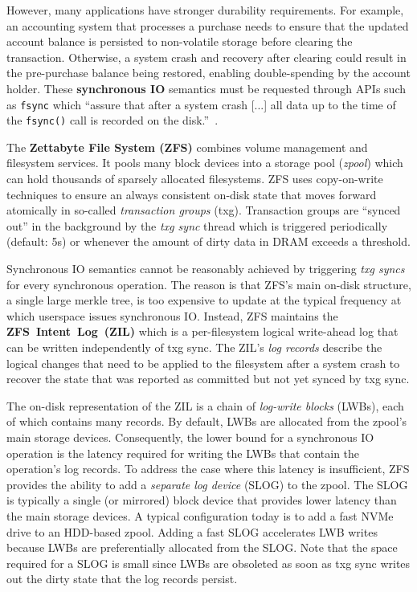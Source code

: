 \documentclass[12pt,a4paper,twoside]{book}
\begin{document}
However, many applications have stronger durability requirements.
For example, an accounting system that processes a purchase needs to ensure that the updated account balance is persisted to non-volatile storage before clearing the transaction.
Otherwise, a system crash and recovery after clearing could result in the pre-purchase balance being restored, enabling double-spending by the account holder.
These \textbf{synchronous IO} semantics must be requested through APIs such as \lstinline{fsync} which ``assure that after a system crash [...] all data up to the time of the \lstinline{fsync()} call is recorded on the disk.''~\cite{OpenGroupFsync}.

The \textbf{Zettabyte File System (ZFS)} combines volume management and filesystem services.
It pools many block devices into a storage pool (\textit{zpool}) which can hold thousands of sparsely allocated filesystems.
ZFS uses copy-on-write techniques to ensure an always consistent on-disk state that moves forward atomically in so-called \textit{transaction groups} (txg).
Transaction groups are ``synced out'' in the background by the \textit{txg sync} thread which is triggered periodically (default: 5s) or whenever the amount of dirty data in DRAM exceeds a threshold.

Synchronous IO semantics cannot be reasonably achieved by triggering \textit{txg syncs} for every synchronous operation.
The reason is that ZFS's main on-disk structure, a single large merkle tree, is too expensive to update at the typical frequency at which userspace issues synchronous IO.
Instead, ZFS maintains the \mbox{\textbf{ZFS Intent Log (ZIL)}} which is a per-filesystem logical write-ahead log that can be written independently of txg sync.
The ZIL's \textit{log records} describe the logical changes that need to be applied to the filesystem after a system crash to recover the state that was reported as committed but not yet synced by txg sync.

The on-disk representation of the ZIL is a chain of \textit{log-write blocks} (LWBs), each of which contains many records.
By default, LWBs are allocated from the zpool's main storage devices.
Consequently, the lower bound for a synchronous IO operation is the latency required for writing the LWBs that contain the operation's log records.
To address the case where this latency is insufficient, ZFS provides the ability to add a \textit{separate log device} (SLOG) to the zpool.
The SLOG is typically a single (or mirrored) block device that provides lower latency than the main storage devices.
A typical configuration today is to add a fast NVMe drive to an HDD-based zpool.
Adding a fast SLOG accelerates LWB writes because LWBs are preferentially allocated from the SLOG.
Note that the space required for a SLOG is small since LWBs are obsoleted as soon as txg sync writes out the dirty state that the log records persist.
\end{document}
